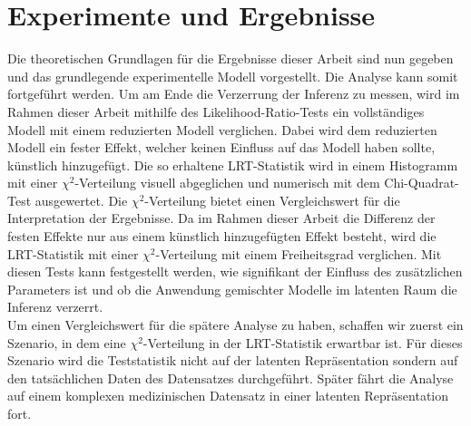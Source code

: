 \documentclass[%
thesis=student,%
coverpage=false,%
titlepage=false,%
headmarks=true, %
german,%
font=libertine, %
math=newpxtx, %
BCOR=5mm,%
coverBCOR=11mm%
]{tumbook}
\theoremstyle{break}
\begin{document}


\section{Experimente und Ergebnisse}
Die theoretischen Grundlagen für die Ergebnisse dieser Arbeit sind nun gegeben und das grundlegende experimentelle Modell  vorgestellt. Die Analyse kann somit fortgeführt werden. Um am Ende die Verzerrung der Inferenz zu messen, wird im Rahmen dieser Arbeit mithilfe des Likelihood-Ratio-Tests ein vollständiges Modell mit einem reduzierten Modell verglichen. Dabei wird dem reduzierten Modell ein fester Effekt, welcher keinen Einfluss auf das Modell haben sollte, künstlich hinzugefügt. Die so erhaltene LRT-Statistik wird in einem Histogramm mit einer $\chi^2$-Verteilung visuell abgeglichen und numerisch mit dem Chi-Quadrat-Test ausgewertet. Die $\chi^2$-Verteilung bietet einen Vergleichswert für die Interpretation der Ergebnisse. Da im Rahmen dieser Arbeit die Differenz der festen Effekte nur aus einem künstlich hinzugefügten Effekt besteht, wird die LRT-Statistik mit einer $\chi^2$-Verteilung mit einem Freiheitsgrad verglichen. Mit diesen Tests kann festgestellt werden, wie signifikant der Einfluss des zusätzlichen Parameters ist und ob die Anwendung gemischter Modelle im latenten Raum die Inferenz verzerrt.\\
Um einen Vergleichswert für die spätere Analyse zu haben, schaffen wir zuerst ein Szenario, in dem eine $\chi^2$-Verteilung in der LRT-Statistik erwartbar ist. Für dieses Szenario wird die Teststatistik nicht auf der latenten Repräsentation sondern auf den tatsächlichen Daten des Datensatzes durchgeführt. Später fährt die Analyse auf einem komplexen medizinischen Datensatz in einer latenten Repräsentation fort.
\end{document}
